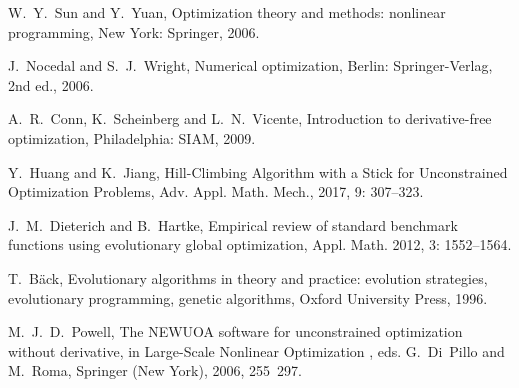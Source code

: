 \begin{thebibliography}{99}

W.~Y.~Sun and Y.~Yuan,
Optimization theory and methods: nonlinear programming,
New York: Springer, 2006.


J.~Nocedal and S.~J.~Wright,
Numerical optimization, 
Berlin: Springer-Verlag, 2nd ed., 2006.

A.~R.~Conn, K.~Scheinberg and L.~N.~Vicente,
Introduction to derivative-free optimization,
Philadelphia: SIAM, 2009.

{Y.~Huang and K.~Jiang,}
{Hill-Climbing Algorithm with a Stick for Unconstrained Optimization Problems},
{Adv. Appl. Math. Mech.},
2017, 9: 307--323.

J.~M.~Dieterich and B.~Hartke, 
Empirical review of standard benchmark functions using evolutionary global optimization,
{Appl. Math.} 2012, 3: 1552--1564.

T.~B{\"a}ck, 
Evolutionary algorithms in theory and practice: evolution
  strategies, evolutionary programming, genetic algorithms,
Oxford University Press, 1996.

M.~J.~D.~Powell,
The NEWUOA software for unconstrained optimization without derivative, in
Large-Scale Nonlinear Optimization , eds. G.~Di~Pillo
and M.~Roma, Springer (New York), 2006, 255~297.



\end{thebibliography}
